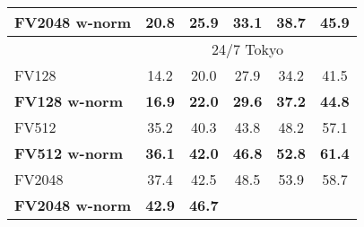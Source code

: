 \begin{tabularx}{0.864\linewidth}{|l|c c c c c|}
        \rowcolor{maroon!10}
        \textbf{FV2048 w-norm}  & \textbf{20.8} & \textbf{25.9} & \textbf{33.1} & \textbf{38.7} & \textbf{45.9} \\
        \hline
			\rowcolor{maroon!40}
			\multicolumn{1}{|c}{\quad} & \multicolumn{5}{c|}{24/7 Tokyo} \\
		\hline
		\rowcolor{maroon!10}
		\textcolor{petr}{FV128} 						&\textcolor{petr}{14.2}     
														&\textcolor{petr}{20.0}     
														&\textcolor{petr}{27.9}     
														&\textcolor{petr}{34.2}     
														&\textcolor{petr}{41.5} \\
		\rowcolor{maroon!10}
		\textcolor{petr}{\textbf{FV128 w-norm}}       	&\textcolor{petr}{\textbf{16.9}}     
														&\textcolor{petr}{\textbf{22.0}}    
														&\textcolor{petr}{\textbf{29.6}}    
														&\textcolor{petr}{\textbf{37.2}}     
														&\textcolor{petr}{\textbf{44.8}} \\  
	    \hline  
		\rowcolor{maroon!10}
		\textcolor{petr}{FV512}							&\textcolor{petr}{35.2}      
														&\textcolor{petr}{40.3}       
														&\textcolor{petr}{43.8}      
														&\textcolor{petr}{48.2}      
														&\textcolor{petr}{57.1} \\
		\rowcolor{maroon!10}
		\textcolor{petr}{\textbf{FV512 w-norm}}			&\textcolor{petr}{\textbf{36.1}}       
														&\textcolor{petr}{\textbf{42.0}}      
														&\textcolor{petr}{\textbf{46.8}}
														&\textcolor{petr}{\textbf{52.8}}       
														&\textcolor{petr}{\textbf{61.4}} \\ 
	    \hline   
    	\rowcolor{maroon!10}
    	\textcolor{petr}{FV2048}						&\textcolor{petr}{37.4}       
					    								&\textcolor{petr}{42.5}       
					    								&\textcolor{petr}{48.5}       
					    								&\textcolor{petr}{53.9}       
					    								&\textcolor{petr}{58.7} 	\\
    	\rowcolor{maroon!10}
		\textcolor{petr}{\textbf{FV2048 w-norm}}		&\textcolor{petr}{\textbf{42.9}}       
														&\textcolor{petr}{\textbf{46.7}}       

\end{tabularx}
